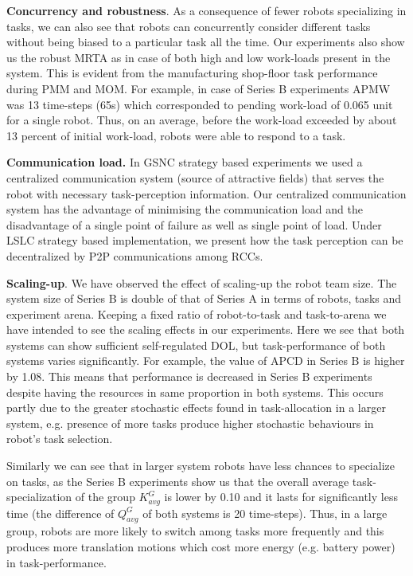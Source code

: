 \documentclass[final,5p,times,twocolumn]{elsarticle}
\begin{document}
\textbf{Concurrency and robustness}. As a consequence of fewer robots specializing in tasks, we can also see that robots can concurrently  consider different tasks without being biased to a particular task all the time. Our experiments also show us the robust MRTA as in case of  both high and low work-loads present in the system. This is evident from the manufacturing shop-floor task performance during PMM and MOM. For example,  in case of Series B experiments APMW was 13 time-steps (65s) which corresponded  to pending work-load of 0.065 unit for a single robot. Thus, on an average, before the work-load exceeded by about 13 percent of initial work-load, robots were able to respond to  a task.

\textbf{Communication load.} In GSNC strategy based experiments we used a centralized communication system (source of attractive fields) that serves the robot with necessary task-perception information.  Our centralized communication system has the advantage of minimising the communication load and the disadvantage of a single point of failure as well as single point of load. Under LSLC strategy based implementation, we present how the task perception can be decentralized by P2P communications among RCCs.

\textbf{Scaling-up}. We have observed the effect of scaling-up the robot team size. The system size of Series B is double of that of Series A in terms of robots, tasks and experiment arena. Keeping a fixed ratio of robot-to-task and task-to-arena we have intended to see the scaling effects in our experiments. Here we see that both systems can show sufficient self-regulated DOL, but task-performance of both systems varies significantly. For example, the value of APCD in Series B is higher by 1.08. This means that performance  is decreased in Series B experiments despite having the resources in same proportion in both systems. This occurs partly due to the greater stochastic effects found in task-allocation in a larger system, e.g. presence of more tasks produce higher stochastic behaviours in robot's task selection.

Similarly we can see that in larger system robots have less chances to specialize on tasks, as the Series B experiments show us that the overall average task-specialization of the group $K^G_{avg}$ is lower by 0.10 and it lasts for significantly less time (the difference of $Q^G_{avg}$  of both systems is 20 time-steps). Thus, in a large group, robots are more likely to switch among tasks more frequently and this produces more translation motions which cost more energy (e.g. battery power) in task-performance.
\end{document}
